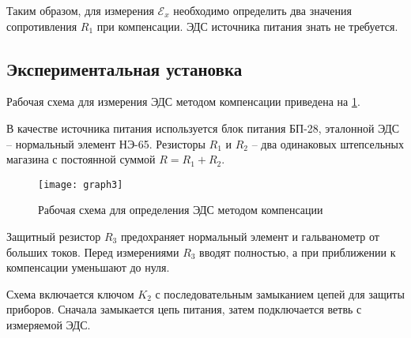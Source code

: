 Таким образом, для измерения $\mathcal{E}_x$ необходимо определить два значения сопротивления $R_1$ при компенсации. ЭДС источника питания знать не требуется.

\subsection{Экспериментальная установка}
Рабочая схема для измерения ЭДС методом компенсации приведена на \cref{fig:3}.

В качестве источника питания используется блок питания БП-28, эталонной ЭДС -- нормальный элемент НЭ-65. Резисторы $R_1$ и $R_2$ -- два одинаковых штепсельных магазина с постоянной суммой $R = R_1 + R_2$.

\begin{figure}[H]
	\centering
	\texttt{[image: graph3]}
	\caption{Рабочая схема для определения ЭДС методом компенсации}
	\label{fig:3}
\end{figure}

Защитный резистор $R_3$ предохраняет нормальный элемент и гальванометр от больших токов. Перед измерениями $R_3$ вводят полностью, а при приближении к компенсации уменьшают до нуля.

Схема включается ключом $K_2$ с последовательным замыканием цепей для защиты приборов. Сначала замыкается цепь питания, затем подключается ветвь с измеряемой ЭДС.
